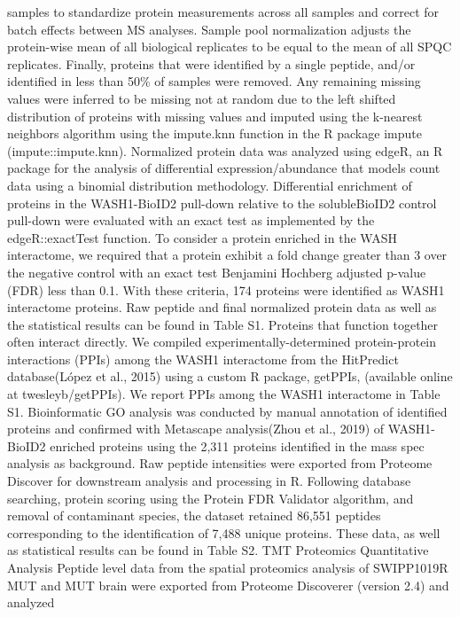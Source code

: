 samples to standardize protein measurements across all samples and correct for
batch effects between MS analyses. Sample pool normalization adjusts the
protein-wise mean of all biological replicates to be equal to the mean of all
SPQC replicates. Finally, proteins that were identified by a single peptide,
and/or identified in less than 50\% of samples were removed. Any remaining
missing values were inferred to be missing not at random due to the left shifted
distribution of proteins with missing values and imputed using the k-nearest
neighbors algorithm using the impute.knn function in the R package impute
(impute::impute.knn). Normalized protein data was analyzed using edgeR, an R
package for the analysis of differential expression/abundance that models count
data using a binomial distribution methodology. Differential enrichment of
proteins in the WASH1-BioID2 pull-down relative to the solubleBioID2 control
pull-down were evaluated with an exact test as implemented by the
edgeR::exactTest function. To consider a protein enriched in the WASH
interactome, we required that a protein exhibit a fold change greater than 3
over the negative control with an exact test Benjamini Hochberg adjusted p-value
(FDR) less than 0.1. With these criteria, 174 proteins were identified as WASH1
interactome proteins. Raw peptide and final normalized protein data as well as
the statistical results can be found in Table S1.
	Proteins that function together often interact directly. We compiled
experimentally-determined protein-protein interactions (PPIs) among the WASH1
interactome from the HitPredict database(López et al., 2015) using a custom R
package, getPPIs, (available online at twesleyb/getPPIs). We report PPIs among
the WASH1 interactome in Table S1.
Bioinformatic GO analysis was conducted by manual annotation of identified
proteins and confirmed with Metascape analysis(Zhou et al., 2019) of
WASH1-BioID2 enriched proteins using the 2,311 proteins identified in the mass
spec analysis as background.  
Raw peptide intensities were exported from Proteome Discover for downstream
analysis and processing in R. Following database searching, protein scoring
using the Protein FDR Validator algorithm, and removal of contaminant species,
the dataset retained 86,551 peptides corresponding to the identification of
7,488 unique proteins. These data, as well as statistical results can be found
in Table S2.
TMT Proteomics Quantitative Analysis 
Peptide level data from the spatial proteomics analysis of SWIPP1019R MUT and
MUT brain were exported from Proteome Discoverer (version 2.4) and analyzed
